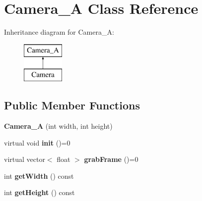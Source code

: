 \hypertarget{class_camera___a}{\section{Camera\-\_\-\-A Class Reference}
\label{class_camera___a}
}
Inheritance diagram for Camera\-\_\-\-A\-:\begin{figure}[H]
\begin{center}
\leavevmode
\includegraphics[height=2.000000cm]{class_camera___a}
\end{center}
\end{figure}
\subsection*{Public Member Functions}
\begin{DoxyCompactItemize}
\item 
\hypertarget{class_camera___a_affa6bad32fb358538d87b42e131789a3}{{\bfseries Camera\-\_\-\-A} (int width, int height)}\label{class_camera___a_affa6bad32fb358538d87b42e131789a3}

\item 
\hypertarget{class_camera___a_a9545b869b944da4a9baa528b8a1fef8e}{virtual void {\bfseries init} ()=0}\label{class_camera___a_a9545b869b944da4a9baa528b8a1fef8e}

\item 
\hypertarget{class_camera___a_afebeedc438219ef7590e2e0b6c140c42}{virtual vector$<$ float $>$ {\bfseries grab\-Frame} ()=0}\label{class_camera___a_afebeedc438219ef7590e2e0b6c140c42}

\item 
\hypertarget{class_camera___a_a4f71c1a128299b587696f996714e0002}{int {\bfseries get\-Width} () const }\label{class_camera___a_a4f71c1a128299b587696f996714e0002}

\item 
\hypertarget{class_camera___a_afe39759777fa2722e0a013ad5af0fe8e}{int {\bfseries get\-Height} () const }\label{class_camera___a_afe39759777fa2722e0a013ad5af0fe8e}

\end{DoxyCompactItemize}
